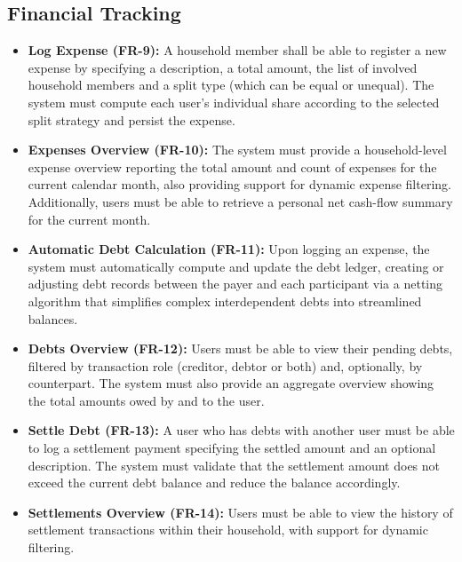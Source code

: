 \subsection{Financial Tracking}
\begin{itemize}
    \item \textbf{Log Expense (FR-9):} A household member shall be able to register a new expense by specifying a description, a total amount, the list of involved household members and a split type (which can be equal or unequal). The system must compute each user's individual share according to the selected split strategy and persist the expense.
    \item \textbf{Expenses Overview (FR-10):} The system must provide a household-level expense overview reporting the total amount and count of expenses for the current calendar month, also providing support for dynamic expense filtering. Additionally, users must be able to retrieve a personal net cash-flow summary for the current month.
    \item \textbf{Automatic Debt Calculation (FR-11):} Upon logging an expense, the system must automatically compute and update the debt ledger, creating or adjusting debt records between the payer and each participant via a netting algorithm that simplifies complex interdependent debts into streamlined balances.
    \item \textbf{Debts Overview (FR-12):} Users must be able to view their pending debts, filtered by transaction role (creditor, debtor or both) and, optionally, by counterpart. The system must also provide an aggregate overview showing the total amounts owed by and to the user.
    \item \textbf{Settle Debt (FR-13):} A user who has debts with another user must be able to log a settlement payment specifying the settled amount and an optional description. The system must validate that the settlement amount does not exceed the current debt balance and reduce the balance accordingly.
    \item \textbf{Settlements Overview (FR-14):} Users must be able to view the history of settlement transactions within their household, with support for dynamic filtering.
\end{itemize}

